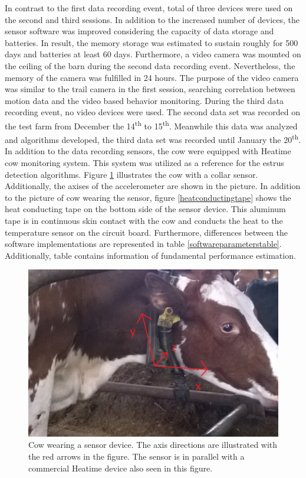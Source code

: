 \documentclass[english,12pt,a4paper,pdftex,elec,utf8]{aaltothesis}
\begin{document}
In contrast to the first data recording event, total of three devices were used on the second and third sessions. In addition to the increased number of devices, the sensor software was improved considering the capacity of data storage and batteries. In result, the memory storage was estimated to sustain roughly for 500 days and batteries at least 60 days. Furthermore, a video camera was mounted on the ceiling of the barn during the second data recording event. Nevertheless, the memory of the camera was fulfilled in 24 hours. The purpose of the video camera was similar to the trail camera in the first session, searching correlation between motion data and the video based behavior monitoring. During the third data recording event, no video devices were used. The second data set was recorded on the test farm from December the 14\textsuperscript{th} to 15\textsuperscript{th}. Meanwhile this data was analyzed and algorithms developed, the third data set was recorded until January the 20\textsuperscript{th}. In addition to the data recording sensors, the cow were equipped with Heatime cow monitoring system. This system was utilized as a reference for the estrus detection algorithms. Figure \ref{sensorikaulassakuva} illustrates the cow with a collar sensor. Additionally, the axises of the accelerometer are shown in the picture. In addition to the picture of cow wearing the sensor, figure \ref{heatconductingtape} shows the heat conducting tape on the bottom side of the sensor device. This aluminum tape is in continuous skin contact with the cow and conducts the heat to the temperature sensor on the circuit board. Furthermore, differences between the software implementations are represented in table \ref{softwareparameterstable}. Additionally, table contains information of fundamental performance estimation.



\begin{figure}[thb]
\centering
\includegraphics[width = 0.75 \textwidth]{figures/sensorikaulassa1.png}
\caption{Cow wearing a sensor device. The axis directions are illustrated with the red arrows in the figure. The sensor is in parallel with a commercial Heatime device also seen in this figure.}\label{sensorikaulassakuva}
\end{figure}
\end{document}
